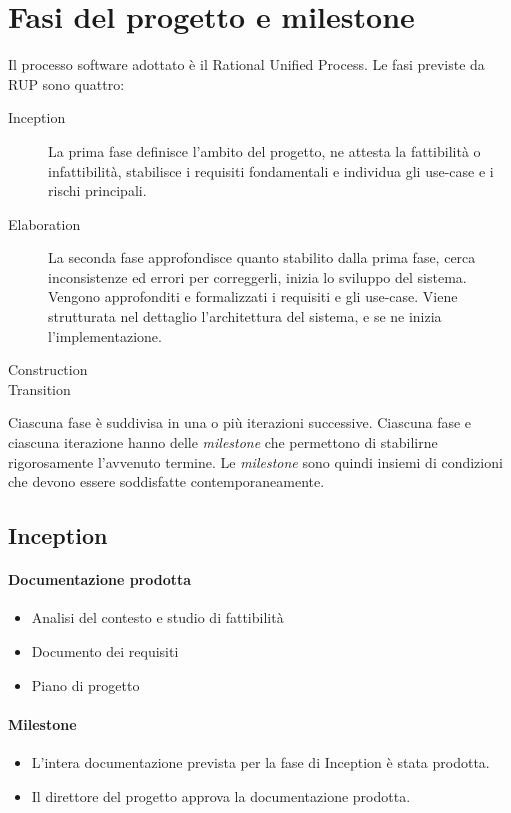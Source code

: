 \section{Fasi del progetto e milestone}

Il processo software adottato \`e il Rational Unified Process.
Le fasi previste da RUP sono quattro:
\begin{description}
	\item[Inception]
	La prima fase definisce l'ambito del progetto, ne attesta la fattibilit\`a o infattibilit\`a, stabilisce i requisiti fondamentali e individua gli use-case e i rischi principali.
	\item[Elaboration]
	La seconda fase approfondisce quanto stabilito dalla prima fase, cerca inconsistenze ed errori per correggerli, inizia lo sviluppo del sistema.
	Vengono approfonditi e formalizzati i requisiti e gli use-case.
	Viene strutturata nel dettaglio l'architettura del sistema, e se ne inizia l'implementazione.
	\item[Construction]
	\item[Transition]
\end{description}

Ciascuna fase \`e suddivisa in una o pi\`u iterazioni successive.
Ciascuna fase e ciascuna iterazione hanno delle \emph{milestone} che permettono di stabilirne rigorosamente l'avvenuto termine.
Le \emph{milestone} sono quindi insiemi di condizioni che devono essere soddisfatte contemporaneamente.

\subsection{Inception}

\paragraph{Documentazione prodotta}
\begin{itemize}
	\item Analisi del contesto e studio di fattibilit\`a
	\item Documento dei requisiti
	\item Piano di progetto
\end{itemize}

\paragraph{Milestone}
\begin{itemize}
	\item L'intera documentazione prevista per la fase di Inception \`e stata prodotta.
	\item Il direttore del progetto approva la documentazione prodotta.
\end{itemize}


